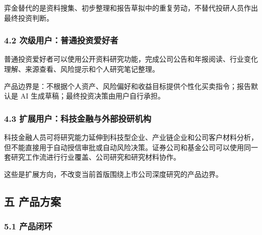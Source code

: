 \documentclass[a4paper,12pt,fontset=none]{ctexart}
\begin{document}
弈金替代的是资料搜集、初步整理和报告草拟中的重复劳动，不替代投研人员作出最终投资判断。

\subsubsection{4.2
次级用户：普通投资爱好者}\label{ux6b21ux7ea7ux7528ux6237ux666eux901aux6295ux8d44ux7231ux597dux8005}

普通投资爱好者可以使用公开资料研究功能，完成公司公告和年报阅读、行业变化理解、来源查看、风险提示和个人研究笔记整理。

产品边界是：不根据个人资产、风险偏好和收益目标提供个性化买卖指令；报告默认是
AI 生成草稿；最终投资决策由用户自行承担。

\subsubsection{4.3
扩展用户：科技金融与外部投研机构}\label{ux6269ux5c55ux7528ux6237ux79d1ux6280ux91d1ux878dux4e0eux5916ux90e8ux6295ux7814ux673aux6784}

科技金融人员可将研究能力延伸到科技型企业、产业链企业和公司客户材料分析，但不能直接用于自动授信审批或自动风险决策。证券公司和基金公司可以使用同一套研究工作流进行行业覆盖、公司研究和研究材料协作。

这些是扩展方向，不改变当前首版围绕上市公司深度研究的产品边界。

\subsection{五 产品方案}\label{ux4e94-ux4ea7ux54c1ux65b9ux6848}

\subsubsection{5.1 产品闭环}\label{ux4ea7ux54c1ux95edux73af}
\end{document}
